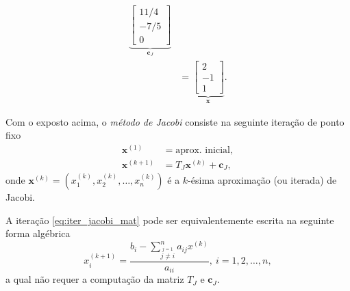 \begin{ex}
\begin{align}
      \underbrace{\begin{bmatrix}
       11/4 \\
       -7/5 \\
       0
      \end{bmatrix}}_{\pmb{c}_J}\\
  &= \underbrace{\begin{bmatrix}
        2 \\
        -1 \\
        1             
      \end{bmatrix}}_{\pmb{x}}.
  \end{align}
% 
\end{ex}

Com o exposto acima, o \emph{método de Jacobi} consiste na seguinte iteração de ponto fixo
\begin{align}
  \pmb{x}^{(1)} &= \text{aprox. inicial},\\
  \pmb{x}^{(k+1)} &= T_J\pmb{x}^{(k)} + \pmb{c}_J,\label{eq:iter_jacobi_mat}
\end{align}
onde $\pmb{x}^{(k)} = (x_1^{(k)}, x_2^{(k)}, \dotsc, x_n^{(k)})$ é a $k$-ésima aproximação (ou iterada) de Jacobi.

A iteração \eqref{eq:iter_jacobi_mat} pode ser equivalentemente escrita na seguinte forma algébrica
\begin{equation}
  x_i^{(k+1)} = \frac{{\displaystyle b_i - \sum_{\overset{j=1}{j\neq i}}^n a_{ij}x^{(k)}}}{a_{ii}},~i=1, 2, \dotsc, n,
\end{equation}
a qual não requer a computação da matriz $T_J$ e $\pmb{c}_J$.

